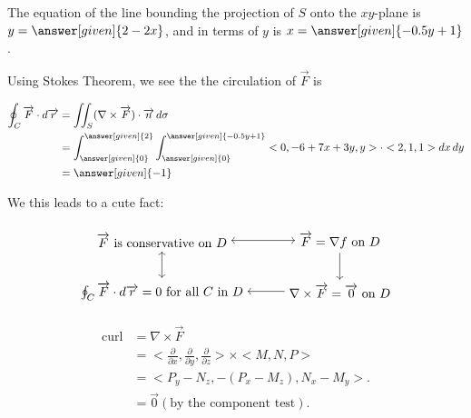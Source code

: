 \documentclass{ximera}
\begin{document}
\begin{example}
\begin{explanation}
The equation of the line bounding the projection of $S$ onto the $xy$-plane is $y = \answer[given]{2 - 2x}$, and in terms of $y$ is $x = \answer[given]{-0.5y + 1}$.

Using Stokes Theorem, we see the the circulation of $\overrightarrow{F}$ is 

    \begin{align*}
      \oint_C \overrightarrow{F} \cdot \d \overrightarrow{r} &= \iint_S (\nabla \times \overrightarrow{F}) \cdot \overrightarrow{n} \d \sigma \\
      &= \int_{\answer[given]{0}}^{\answer[given]{2}} \int_{\answer[given]{0}}^{\answer[given]{-0.5y + 1}} <0, -6 + 7x + 3y, y> \cdot <2,1,1> \d x \d y \\
      &=\answer[given]{-1}
    \end{align*}
\end{explanation}
\end{example}


We this leads to a cute fact:
\begin{fact}

\[
    \begin{tikzpicture}[every node/.style={midway}]
        \matrix[column sep={14em,between origins}, row sep={2em}] at (0,0) {
            \node(A) {$\overrightarrow{F}$ is conservative on $D$}; & \node(B) {$\overrightarrow{F} = \nabla f$ on $D$}; \\
            \node(C) {$\oint_C \overrightarrow{F}\cdot \d \overrightarrow{r} = 0$ for all $C$ in $D$}; & \node(D) {$\nabla \times \overrightarrow{F} = \overrightarrow{0}$ on $D$}; \\
        };

        \draw[<-] (C) -- (D) node[anchor=east]{};
        \draw[<->] (A) -- (B) node[anchor=south]{};
        \draw[->] (B) -- (D) node[anchor=west]{};
        \draw[<->] (A) -- (C) node[anchor=north]{};

    \end{tikzpicture}
\]

\begin{explanation}
    \begin{align*}
      \text{curl} &= \nabla \times \overrightarrow{F} \\
      &= <\frac{\partial}{\partial x}, \frac{\partial}{\partial y}, \frac{\partial}{\partial z}> \times <M, N, P> \\
      &= <P_y - N_z, -(P_x - M_z), N_x - M_y>.\\
      &= \overrightarrow{0} (\text{by the component test}).
    \end{align*}
\end{explanation}
\end{fact}
\end{document}
